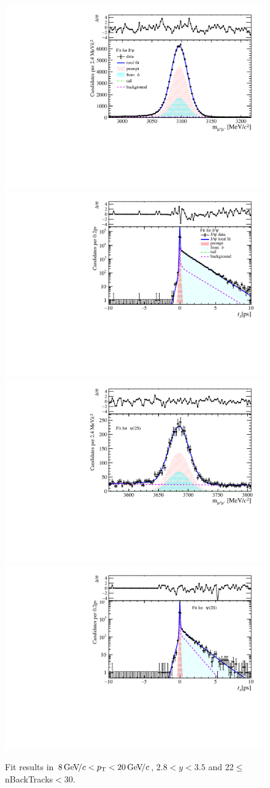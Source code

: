 \begin{figure}[H]
\begin{center}
\includegraphics[width=0.47\linewidth]{pdf/Jpsi/drawmassB/n4y2pt5.pdf}
\includegraphics[width=0.47\linewidth]{pdf/Jpsi/2DFitB/n4y2pt5.pdf}
\vspace*{-0.5cm}
\includegraphics[width=0.47\linewidth]{pdf/Psi2S/drawmassB/n4y2pt5.pdf}
\includegraphics[width=0.47\linewidth]{pdf/Psi2S/2DFitB/n4y2pt5.pdf}
\vspace*{-0.5cm}
\end{center}
\caption{Fit results in $8\text{\,Ge\kern -0.1em V\!/}c<p_{\mathrm{T}}<20\text{\,Ge\kern -0.1em V\!/}c$, $2.8<y<3.5$ and 22$\leq$nBackTracks$<$30.}
\label{Fitn4y2pt5}
\end{figure}
